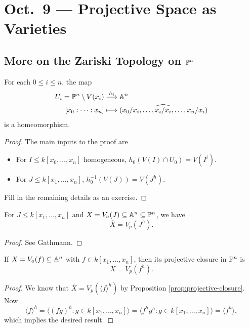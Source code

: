 \chapter{Oct.~9 --- Projective Space as Varieties}

\section{More on the Zariski Topology on \texorpdfstring{$\mathbb{P}^n$}{Pn}}
\begin{prop}
  For each $0 \le i \le n$,
  the map
  \begin{align*}
    U_i = \mathbb{P}^n \setminus V(x_i)
    &\overset{h_i}{\longrightarrow} \mathbb{A}^n \\
    [x_0 : \cdots : x_n]
    &\longmapsto
    (x_0 / x_i, \dots, \widehat{x_i / x_i}, \dots, x_n / x_i)
  \end{align*}
  is a homeomorphism.
\end{prop}

\begin{proof}
  The main inputs to the proof are
  \begin{itemize}
    \item For $I \le k[x_0, \dots, x_n]$
      homogeneous,
      $h_0(V(I) \cap U_0) = V(I^i)$.
    \item For $J \le k[x_1, \dots, x_n]$,
      $h_0^{-1}(V(J)) = V(J^h)$.
  \end{itemize}
  Fill in the remaining details as
  an exercise.
\end{proof}

\begin{prop}\label{prop:projective-closure}
  For $J \le k[x_1, \dots, x_n]$
  and $X = V_a(J) \subseteq \mathbb{A}^n \subseteq \mathbb{P}^n$,
  we have
  \[
    \overline{X} = V_p(J^h).
  \]
\end{prop}

\begin{proof}
  See Gathmann.
\end{proof}

\begin{prop}
  If $X = V_a(f) \subseteq \mathbb{A}^n$ with $f \in k[x_1, \dots, x_n]$,
  then its projective closure
  in $\mathbb{P}^n$ is
  \[
    \overline{X} = V_p(f^h).
  \]
\end{prop}

\begin{proof}
  We know that
  $\overline{X} = V_p(\langle f \rangle^h)$
  by Proposition
  \ref{prop:projective-closure}.
  Now
  \[
    \langle f \rangle^h
    = \langle (fg)^h : g \in k[x_1, \dots, x_n] \rangle
    = \langle f^h g^h : g \in k[x_1, \dots, x_n] \rangle
    = \langle f^h \rangle,
  \]
  which implies the desired result.
\end{proof}

